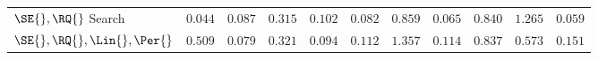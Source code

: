\begin{table}[h]
{\begin{center}
\begin{tabularx}{\textwidth}{l | XXXXX | XXXXX}
$\SE{}, \RQ{}$ Search
& $\mathbf{0.044}$ & $\mathbf{0.087}$ & $\mathbf{0.315}$ & $\mathbf{0.102}$ & $\mathbf{0.082}$
& $\mathbf{0.859}$ & $\mathbf{0.065}$ & $\mathbf{0.840}$ & $1.265$ & $\mathbf{0.059}$ \\
$\SE{}, \RQ{}, \Lin{}, \Per{}$
& $\mathbf{0.509}$ & $\mathbf{0.079}$ & $\mathbf{0.321}$ & $\mathbf{0.094}$ & $\mathbf{0.112}$
& $\mathbf{1.357}$ & $\mathbf{0.114}$ & $\mathbf{0.837}$ & $\mathbf{0.573}$ & $\mathbf{0.151}$ \\
\end{tabularx}
\end{center}
}
\end{table}
%

\fi


